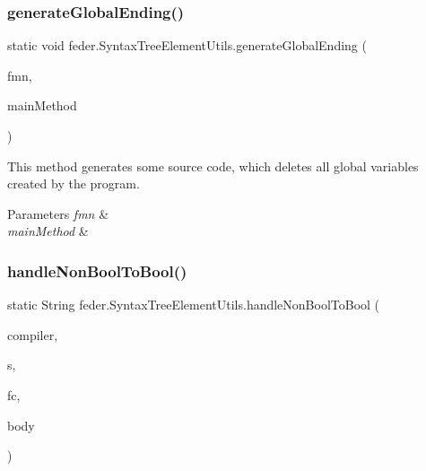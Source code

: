 \subsubsection{\texorpdfstring{generate\+Global\+Ending()}{generateGlobalEnding()}}
{\footnotesize\ttfamily static void feder.\+Syntax\+Tree\+Element\+Utils.\+generate\+Global\+Ending (\begin{DoxyParamCaption}\item[{\hyperlink{classfeder_1_1types_1_1FederBody}{Feder\+Body}}]{fmn,  }\item[{String\+Builder}]{main\+Method }\end{DoxyParamCaption})\hspace{0.3cm}{\ttfamily [static]}}

This method generates some source code, which deletes all global variables created by the program.


\begin{DoxyParams}{Parameters}
{\em fmn} & \\
\hline
{\em main\+Method} & \\
\hline
\end{DoxyParams}
\mbox{\label{classfeder_1_1SyntaxTreeElementUtils_a5ab3b5907289b30822f67451d12fcd55}} 
\subsubsection{\texorpdfstring{handle\+Non\+Bool\+To\+Bool()}{handleNonBoolToBool()}}
{\footnotesize\ttfamily static String feder.\+Syntax\+Tree\+Element\+Utils.\+handle\+Non\+Bool\+To\+Bool (\begin{DoxyParamCaption}\item[{\hyperlink{classfeder_1_1FederCompiler}{Feder\+Compiler}}]{compiler,  }\item[{String}]{s,  }\item[{\hyperlink{classfeder_1_1types_1_1FederClass}{Feder\+Class}}]{fc,  }\item[{\hyperlink{classfeder_1_1types_1_1FederBody}{Feder\+Body}}]{body }\end{DoxyParamCaption})\hspace{0.3cm}{\ttfamily [static]}}

